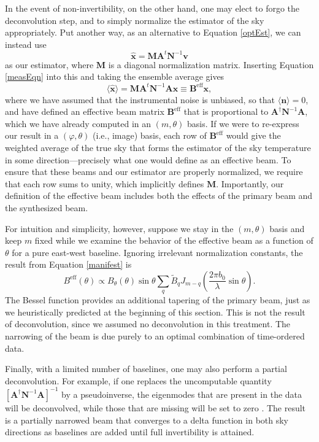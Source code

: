 \documentclass[twocolumn,apj,numberedappendix]{emulateapj}
\newcommand{\vis}{\mathbf{v}}
\newcommand{\x}{\mathbf{x}}
\newcommand{\A}{\mathbf{A}}
\newcommand{\N}{\mathbf{N}}
\begin{document}
In the event of non-invertibility, on the other hand, one may elect to forgo
the deconvolution step, and to simply normalize the estimator of the sky
appropriately.  Put another way, as an alternative to Equation \eqref{optEst},
we can instead use
\begin{equation}
\hat{\x} = \mathbf{M} \A^t \N^{-1} \vis
\end{equation}
as our estimator, where $\mathbf{M}$ is a diagonal normalization matrix.
Inserting Equation \eqref{measEqn} into this and taking the ensemble average
gives
\begin{equation}
\langle \hat{\x} \rangle = \mathbf{M} \A^t \N^{-1} \A \x \equiv \mathbf{B}^\textrm{eff} \x,
\end{equation}
where we have assumed that the instrumental noise is unbiased, so that $\langle
\mathbf{n} \rangle = 0$, and have defined an effective beam matrix
$\mathbf{B}^\textrm{eff}$ that is proportional to $\A^\dagger \N^{-1} \A$,
which we have already computed in an $(m, \theta)$ basis.  If we were to
re-express our result in a $(\varphi, \theta)$ (i.e., image) basis, each row of
$\mathbf{B}^\textrm{eff}$ would give the weighted average of the true sky that
forms the estimator of the sky temperature in some direction---precisely what
one would define as an effective beam.  To ensure that these beams and our
estimator are properly normalized, we require that each row sums to unity,
which implicitly defines $\mathbf{M}$.  Importantly, our definition of the
effective beam includes both the effects of the primary beam and the
synthesized beam.

For intuition and simplicity, however, suppose we stay in the $(m, \theta)$
basis and keep $m$ fixed while we examine the behavior of the effective beam as
a function of $\theta$ for a pure east-west baseline.  Ignoring irrelevant
normalization constants, the result from Equation \eqref{manifest} is
\begin{equation}
B^\textrm{eff} (\theta) \propto B_\theta (\theta) \sin \theta \sum_q \widetilde{B}_q  J_{m-q} \left( \frac{2 \pi b_0}{\lambda} \sin \theta \right).
\end{equation}
The Bessel function provides an additional tapering of the primary beam, just
as we heuristically predicted at the beginning of this section.  This is not
the result of deconvolution, since we assumed no deconvolution in this
treatment.  The narrowing of the beam is due purely to an optimal combination
of time-ordered data.

Finally, with a limited number of baselines, one may also perform a partial
deconvolution.  For example, if one replaces the uncomputable quantity $\left[
\A^\dagger \N^{-1} \A \right]^{-1}$ by a pseudoinverse, the eigenmodes that are
present in the data will be deconvolved, while those that are missing will be
set to zero \citep{Shaw2013}.  The result is a partially narrowed beam that
converges to a delta function in both sky directions as baselines are added
until full invertibility is attained.
\end{document}
